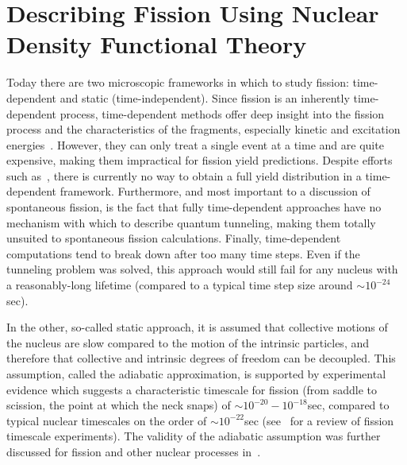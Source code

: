 \chapter{Describing Fission Using Nuclear Density Functional Theory}\label{chap:Model}


Today there are two microscopic frameworks in which to study fission: time-dependent and static (time-independent). Since fission is an inherently time-dependent process, time-dependent methods offer deep insight into the fission process and the characteristics of the fragments, especially kinetic and excitation energies~\cite{Scamps2018, Scamps2015a, Simenel2014, Grineviciute2018, Umar2010}. However, they can only treat a single event at a time and are quite expensive, making them impractical for fission yield predictions. Despite efforts such as~\cite{Scamps2015, Bulgac2018}, there is currently no way to obtain a full yield distribution in a time-dependent framework. Furthermore, and most important to a discussion of spontaneous fission, is the fact that fully time-dependent approaches have no mechanism with which to describe quantum tunneling, making them totally unsuited to spontaneous fission calculations. Finally, time-dependent computations tend to break down after too many time steps. Even if the tunneling problem was solved, this approach would still fail for any nucleus with a reasonably-long lifetime (compared to a typical time step size around ${\sim}10^{-24}$ sec).

In the other, so-called static approach, it is assumed that collective motions of the nucleus are slow compared to the motion of the intrinsic particles, and therefore that collective and intrinsic degrees of freedom can be decoupled. This assumption, called the adiabatic approximation, is supported by experimental evidence which suggests a characteristic timescale for fission (from saddle to scission, the point at which the neck snaps) of ${\sim}10^{-20}-10^{-18}$sec, compared to typical nuclear timescales on the order of ${\sim}10^{-22}$sec (see~\cite{Jacquet2009} for a review of fission timescale experiments). The validity of the adiabatic assumption was further discussed for fission and other nuclear processes in~\cite{Nazarewicz1993}.

